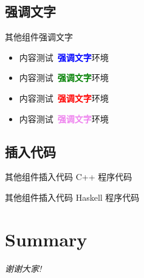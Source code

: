\documentclass[no-math, compress]{beamer}
\newcommand\blueText[1]{\textcolor{blue}{\bf #1}}
\newcommand\greenText[1]{\textcolor{green}{\bf #1}}
\newcommand\redText[1]{\textcolor{red}{\bf #1}}
\newcommand\violetText[1]{\textcolor{violet}{\bf #1}}
\begin{document}
\subsection{强调文字}


\begin{frame}{其他组件}{强调文字}
    \begin{itemize}
        \item 内容测试~\blueText{强调文字}环境
        \item 内容测试~\greenText{强调文字}环境
        \item 内容测试~\redText{强调文字}环境
        \item 内容测试~\violetText{强调文字}环境
    \end{itemize}
\end{frame}


\subsection{插入代码}


\begin{frame}[fragile]{其他组件}{插入代码}
    C++ 程序代码 \\
    \begin{center}
        \codeTipHelloWorld
    \end{center}
\end{frame}


\begin{frame}[fragile]{其他组件}{插入代码}
    Haskell 程序代码 \\
    \begin{center}
        \codeTipHaskell
    \end{center}
\end{frame}


\section{Summary}


\begin{frame}
    \begin{center}
        {\Huge \it 谢谢大家!}
    \end{center}
\end{frame}
\end{document}
